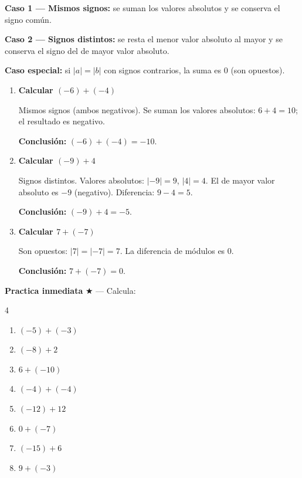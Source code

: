 \documentclass[11pt, letterpaper]{article}
\begin{document}
\begin{tcolorbox}[importantbox, title={Reglas de la adici\'on de enteros}]
\textbf{Caso 1 --- Mismos signos:} se suman los valores absolutos y se conserva el signo com\'un.

\textbf{Caso 2 --- Signos distintos:} se resta el menor valor absoluto al mayor y se conserva el signo del de mayor valor absoluto.

\textbf{Caso especial:} si $|a|=|b|$ con signos contrarios, la suma es $0$ (son opuestos).
\end{tcolorbox}

\begin{tcolorbox}[examplebox, title={Ejemplos --- suma de enteros}]
\begin{enumerate}[label=\textbf{Ej. \arabic*.}, leftmargin=*, itemsep=12pt]

\item \textbf{Calcular $(-6)+(-4)$}

Mismos signos (ambos negativos). Se suman los valores absolutos: $6+4=10$; el resultado es negativo.

\textbf{Conclusi\'on:} $(-6)+(-4)=-10$.

\item \textbf{Calcular $(-9)+4$}

Signos distintos. Valores absolutos: $|-9|=9$, $|4|=4$. El de mayor valor absoluto es $-9$ (negativo). Diferencia: $9-4=5$.

\textbf{Conclusi\'on:} $(-9)+4=-5$.

\item \textbf{Calcular $7+(-7)$}

Son opuestos: $|7|=|-7|=7$. La diferencia de m\'odulos es $0$.

\textbf{Conclusi\'on:} $7+(-7)=0$.

\end{enumerate}
\end{tcolorbox}

\medskip
\textbf{Practica inmediata} \quad $\bigstar$ --- Calcula:
\begin{multicols}{4}
\begin{enumerate}[label=\alph*), leftmargin=*]
  \item $(-5)+(-3)$
  \item $(-8)+2$
  \item $6+(-10)$
  \item $(-4)+(-4)$
  \item $(-12)+12$
  \item $0+(-7)$
  \item $(-15)+6$
  \item $9+(-3)$
\end{enumerate}
\end{multicols}
\end{document}
